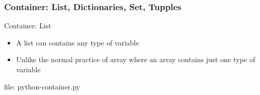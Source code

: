 \begin{frame}[fragile]
\frametitle{Container: List, Dictionaries, Set, Tupples}
\newcommand{\newfilename}{python-container.py}
Container: List
\begin{itemize}
\item A list can contains any type of variable
\item Unlike the normal practice of array where an array contains just one type of variable
\end{itemize}


file: \newfilename
\end{frame}